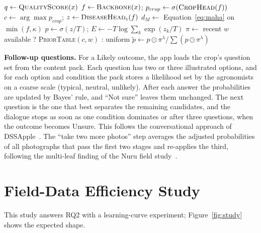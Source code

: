 \begin{algorithm}[H]
\small
{}
$q \leftarrow \textsc{QualityScore}(x)$\;
$f \leftarrow \textsc{Backbone}(x)$; \quad $p_{crop} \leftarrow \sigma(\textsc{CropHead}(f))$\;
$c \leftarrow \arg\max p_{crop}$; \quad $z \leftarrow \textsc{DiseaseHead}_{c}(f)$\;
$d_M \leftarrow$ Equation~\ref{eq:maha} on $\min(f, \kappa)$\;
$p \leftarrow \sigma(z / T)$; \quad $E \leftarrow -T\log\sum_k \exp(z_k/T)$\;
$\pi \leftarrow$ recent $w$ available ? \textsc{PriorTable}$(c, w)$ : uniform\;
$\tilde{p} \leftarrow p \odot \pi^{\lambda} / \sum (p \odot \pi^{\lambda})$\;
\caption{Diagnosis with the uncertainty check and weather adjustment.}
\label{algo:gate}
\end{algorithm}

\textbf{Follow-up questions.} For a Likely outcome, the app loads the crop's question set from the content pack. Each question has two or three illustrated options, and for each option and condition the pack stores a likelihood set by the agronomists on a coarse scale (typical, neutral, unlikely). After each answer the probabilities are updated by Bayes' rule, and ``Not sure'' leaves them unchanged. The next question is the one that best separates the remaining candidates, and the dialogue stops as soon as one condition dominates or after three questions, when the outcome becomes Unsure. This follows the conversational approach of DSSApple~\cite{sottocornola2022dssapple}. The ``take two more photos'' step averages the adjusted probabilities of all photographs that pass the first two stages and re-applies the third, following the multi-leaf finding of the Nuru field study~\cite{mrisho2020nuru}.

\section{Field-Data Efficiency Study}
\label{sec:study}
This study answers RQ2 with a learning-curve experiment; Figure~\ref{fig:study} shows the expected shape.

